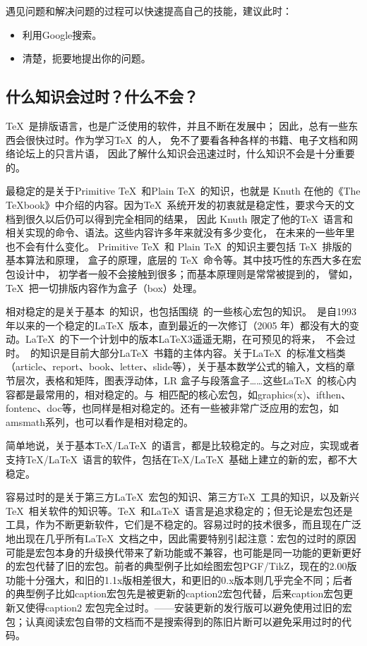 遇见问题和解决问题的过程可以快速提高自己的技能，建议此时：
\begin{itemize}
	\item 利用Google搜索。
	\item 清楚，扼要地提出你的问题。
\end{itemize}

\subsection{什么知识会过时？什么不会？}
\TeX~是排版语言，也是广泛使用的软件，并且不断在发展中；
因此，总有一些东西会很快过时。作为学习\TeX~的人，
免不了要看各种各样的书籍、电子文档和网络论坛上的只言片语，
因此了解什么知识会迅速过时，什么知识不会是十分重要的。

最稳定的是关于Primitive \TeX~和Plain \TeX~的知识，也就是 Knuth
在他的《The TeXbook》中介绍的内容。因为\TeX~系统开发的初衷就是稳定性，要求今天的文档到很久以后仍可以得到完全相同的结果，
因此 Knuth 限定了他的\TeX~语言和相关实现的命令、语法。这些内容许多年来就没有多少变化，
在未来的一些年里也不会有什么变化。
Primitive \TeX~和 Plain \TeX~的知识主要包括 \TeX~排版的基本算法和原理，
盒子的原理，底层的 \TeX~命令等。其中技巧性的东西大多在宏包设计中，
初学者一般不会接触到很多；而基本原理则是常常被提到的，
譬如，\TeX~把一切排版内容作为盒子（box）处理。

相对稳定的是关于基本\LaTeXe~的知识，也包括围绕\LaTeXe~的一些核心宏包的知识。\LaTeXe~是自1993年以来的一个稳定的\LaTeX~版本，直到最近的一次修订（2005 年）都没有大的变动。\LaTeX~的下一个计划中的版本\LaTeX 3遥遥无期，在可预见的将来，\LaTeXe~不会过时。\LaTeXe~的知识是目前大部分\LaTeX~书籍的主体内容。关于\LaTeX~的标准文档类（article、report、book、letter、slide等），关于基本数学公式的输入，文档的章节层次，表格和矩阵，图表浮动体，LR 盒子与段落盒子……这些\LaTeX~的核心内容都是最常用的，相对稳定的。与\LaTeXe~相匹配的核心宏包，如graphics(x)、ifthen、fontenc、doc等，也同样是相对稳定的。还有一些被非常广泛应用的宏包，如amsmath系列，也可以看作是相对稳定的。

简单地说，关于基本\TeX/\LaTeX~的语言，都是比较稳定的。与之对应，实现或者支持\TeX/\LaTeX~语言的软件，包括在\TeX/\LaTeX~基础上建立的新的宏，都不大稳定。

容易过时的是关于第三方\LaTeX~宏包的知识、第三方\TeX~工具的知识，以及新兴\TeX~相关软件的知识等。\TeX~和\LaTeX~语言是追求稳定的；但无论是宏包还是工具，作为不断更新软件，它们是不稳定的。容易过时的技术很多，而且现在广泛地出现在几乎所有\LaTeX~文档之中，因此需要特别引起注意：宏包的过时的原因可能是宏包本身的升级换代带来了新功能或不兼容，也可能是同一功能的更新更好的宏包代替了旧的宏包。前者的典型例子比如绘图宏包PGF/TikZ，现在的2.00版功能十分强大，和旧的1.1x版相差很大，和更旧的0.x版本则几乎完全不同；后者的典型例子比如caption宏包先是被更新的caption2宏包代替，后来caption宏包更新又使得caption2 宏包完全过时。——安装更新的发行版可以避免使用过旧的宏包；认真阅读宏包自带的文档而不是搜索得到的陈旧片断可以避免采用过时的代码。

